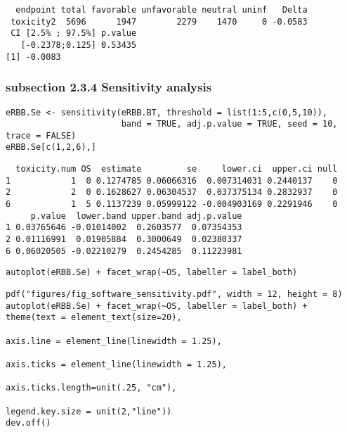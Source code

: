 \documentclass[12pt]{article}
\begin{document}
\begin{verbatim}
  endpoint total favorable unfavorable neutral uninf   Delta
 toxicity2  5696      1947        2279    1470     0 -0.0583
 CI [2.5% ; 97.5%] p.value
   [-0.2378;0.125] 0.53435
[1] -0.0083
\end{verbatim}

\subsubsection{subsection 2.3.4 Sensitivity analysis}
\label{sec:org6f95a3a}

\lstset{language=r,label= ,caption= ,captionpos=b,numbers=none}
\begin{lstlisting}
eRBB.Se <- sensitivity(eRBB.BT, threshold = list(1:5,c(0,5,10)),
                       band = TRUE, adj.p.value = TRUE, seed = 10, trace = FALSE)
eRBB.Se[c(1,2,6),]
\end{lstlisting}

\begin{verbatim}
  toxicity.num OS  estimate         se     lower.ci  upper.ci null
1            1  0 0.1274785 0.06066316  0.007314031 0.2440137    0
2            2  0 0.1628627 0.06304537  0.037375134 0.2832937    0
6            1  5 0.1137239 0.05999122 -0.004903169 0.2291946    0
     p.value  lower.band upper.band adj.p.value
1 0.03765646 -0.01014002  0.2603577  0.07354353
2 0.01116991  0.01905884  0.3000649  0.02380337
6 0.06020505 -0.02210279  0.2454285  0.11223981
\end{verbatim}


\lstset{language=r,label= ,caption= ,captionpos=b,numbers=none}
\begin{lstlisting}
autoplot(eRBB.Se) + facet_wrap(~OS, labeller = label_both)
\end{lstlisting}

\lstset{language=r,label= ,caption= ,captionpos=b,numbers=none}
\begin{lstlisting}
pdf("figures/fig_software_sensitivity.pdf", width = 12, height = 8)
autoplot(eRBB.Se) + facet_wrap(~OS, labeller = label_both) + theme(text = element_text(size=20), 
                                                                   axis.line = element_line(linewidth = 1.25),
                                                                   axis.ticks = element_line(linewidth = 1.25),
                                                                   axis.ticks.length=unit(.25, "cm"),
                                                                   legend.key.size = unit(2,"line"))
dev.off()
\end{lstlisting}
\end{document}
